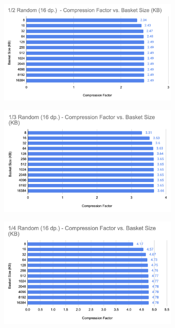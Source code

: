\begin{figure}[h]
    \centering
    \begin{subfigure}{.5\textwidth}
        \centering
        \includegraphics[width=\textwidth]{content/toymodel_content/4.18/1_of_2.png}
        \label{fig:toymodel_418_compF_vs_basketsize_subA}
      \end{subfigure}%
      \begin{subfigure}{.5\textwidth}
        \centering
        \includegraphics[width=\textwidth]{content/toymodel_content/4.18/1_of_3.png}
        \label{fig:toymodel_418_compF_vs_basketsize_subB}
      \end{subfigure}%
      \linebreak
      \begin{subfigure}{.5\textwidth}
        \centering
        \includegraphics[width=\textwidth]{content/toymodel_content/4.18/1_of_4.png}

\end{subfigure}
\end{figure}
